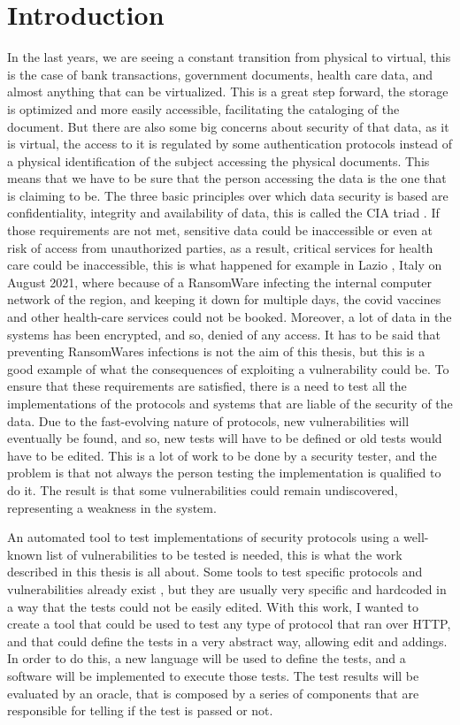 \chapter{Introduction}
In the last years, we are seeing a constant transition from physical to virtual, this is the case of bank transactions, government documents, health care data, and almost anything that can be virtualized. This is a great step forward, the storage is optimized and more easily accessible, facilitating the cataloging of the document. But there are also some big concerns about security of that data, as it is virtual, the access to it is regulated by some authentication protocols instead of a physical identification of the subject accessing the physical documents. This means that we have to be sure that the person accessing the data is the one that is claiming to be. The three basic principles over which data security is based are confidentiality, integrity and availability of data, this is called the CIA triad \cite{cia_triad}.
If those requirements are not met, sensitive data could be inaccessible or even at risk of access from unauthorized parties, as a result, critical services for health care could be inaccessible, this is what happened for example in Lazio \cite{lazio_hacker_0,lazio_hacker_1}, Italy on August 2021, where because of a RansomWare infecting the internal computer network of the region, and keeping it down for multiple days, the covid vaccines and other health-care services could not be booked. Moreover, a lot of data in the systems has been encrypted, and so, denied of any access. It has to be said that preventing RansomWares infections is not the aim of this thesis, but this is a good example of what the consequences of exploiting a vulnerability could be.
To ensure that these requirements are satisfied, there is a need to test all the implementations of the protocols and systems that are liable of the security of the data. Due to the fast-evolving nature of protocols, new vulnerabilities will eventually be found, and so, new tests will have to be defined or old tests would have to be edited. This is a lot of work to be done by a security tester, and the problem is that not always the person testing the implementation is qualified to do it. The result is that some vulnerabilities could remain undiscovered, representing a weakness in the system.

An automated tool to test implementations of security protocols using a well-known list of vulnerabilities to be tested is needed, this is what the work described in this thesis is all about. Some tools to test specific protocols and vulnerabilities already exist \cite{wendy_barreto,claudio_grisenti}, but they are usually very specific and hardcoded in a way that the tests could not be easily edited. With this work, I wanted to create a tool that could be used to test any type of protocol that ran over HTTP, and that could define the tests in a very abstract way, allowing edit and addings. In order to do this, a new language will be used to define the tests, and a software will be implemented to execute those tests. The test results will be evaluated by an oracle, that is composed by a series of components that are responsible for telling if the test is passed or not.

